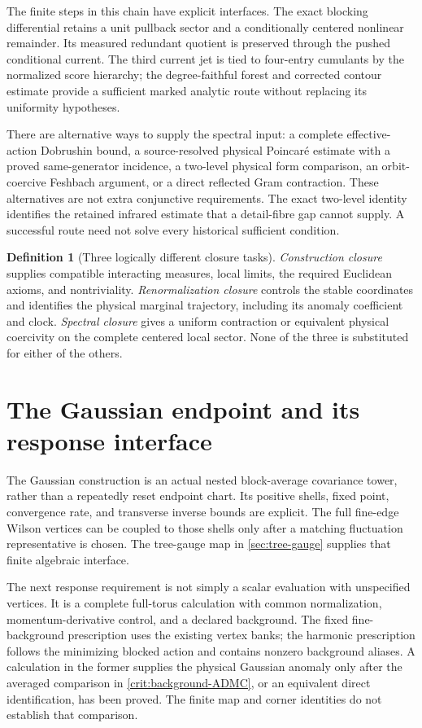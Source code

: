 \documentclass[11pt,oneside,openany]{book}
\theoremstyle{definition}
\newtheorem{definition}[definition]{Definition}
\theoremstyle{remark}
\begin{document}
The finite steps in this chain have explicit interfaces. The exact
blocking differential retains a unit pullback sector and a conditionally
centered nonlinear remainder. Its measured redundant quotient is
preserved through the pushed conditional current. The third current
jet is tied to four-entry cumulants by the normalized score hierarchy;
the degree-faithful forest and corrected contour estimate provide a
sufficient marked analytic route without replacing its uniformity
hypotheses.

There are alternative ways to supply the spectral input: a complete
effective-action Dobrushin bound, a source-resolved physical
Poincar\'e estimate with a proved same-generator incidence, a two-level
physical form comparison, an orbit-coercive Feshbach argument, or a direct
reflected Gram contraction. These alternatives are not extra conjunctive
requirements. The exact two-level identity identifies the retained
infrared estimate that a detail-fibre gap cannot supply. A successful
route need not solve every historical sufficient condition.

\begin{definition}[Three logically different closure tasks]
\label{def:three-tasks}
\emph{Construction closure} supplies compatible interacting measures, local limits, the required Euclidean axioms, and nontriviality. \emph{Renormalization closure} controls the stable coordinates and identifies the physical marginal trajectory, including its anomaly coefficient and clock. \emph{Spectral closure} gives a uniform contraction or equivalent physical coercivity on the complete centered local sector. None of the three is substituted for either of the others.
\end{definition}

\section{The Gaussian endpoint and its response interface}
The Gaussian construction is an actual nested block-average covariance
tower, rather than a repeatedly reset endpoint chart. Its positive shells,
fixed point, convergence rate, and transverse inverse bounds are explicit.
The full fine-edge Wilson vertices can be coupled to those shells only
after a matching fluctuation representative is chosen. The tree-gauge map
in \cref{sec:tree-gauge} supplies that finite algebraic interface.

The next response requirement is not simply a scalar evaluation with
unspecified vertices. It is a complete full-torus calculation with common
normalization, momentum-derivative control, and a declared background.
The fixed fine-background prescription uses the existing vertex banks;
the harmonic prescription follows the minimizing blocked action and
contains nonzero background aliases. A calculation in the former supplies
the physical Gaussian anomaly only after the averaged comparison in
\cref{crit:background-ADMC}, or an equivalent direct identification, has
been proved. The finite map and corner identities do not establish that
comparison.
\end{document}
